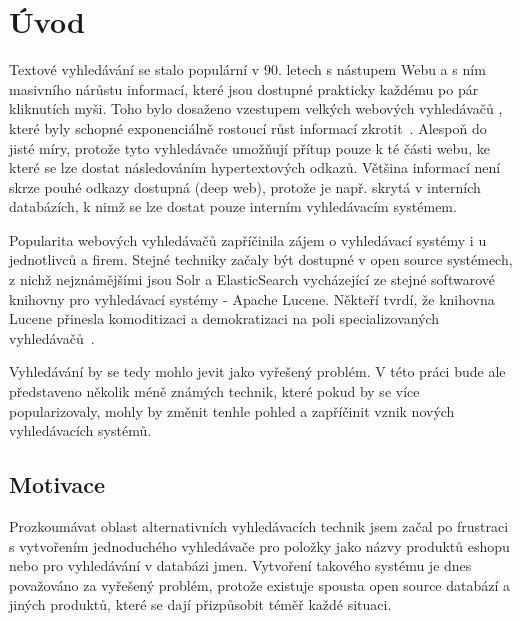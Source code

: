 \documentclass[11pt,letterpaper,oneside,openright]{book}
\begin{document}
\frontmatter
{\hypersetup{hidelinks}
    \tableofcontents
}

\mainmatter
\chapter{Úvod}
Textové vyhledávání se stalo populární v 90. letech s nástupem Webu a s ním
masivního nárůstu informací, které jsou dostupné prakticky každému po pár
kliknutích myši. Toho bylo dosaženo vzestupem velkých webových vyhledávačů ,
které byly schopné exponenciálně rostoucí růst informací
zkrotit~\cite{search_history}. Alespoň do jisté míry, protože tyto vyhledávače
umožňují přítup pouze k té části webu, ke které se lze dostat následováním
hypertextových odkazů. Většina informací není skrze pouhé odkazy dostupná (deep
web), protože je např. skrytá v interních databázích, k nimž se lze dostat
pouze interním vyhledávacím systémem.

Popularita webových vyhledávačů zapříčinila zájem o vyhledávací systémy i u
jednotlivců a firem. Stejné techniky začaly být dostupné v open source
systémech, z nichž nejznámějšími jsou Solr a ElasticSearch vycházející ze
stejné softwarové knihovny pro vyhledávací systémy - Apache Lucene. Někteří
tvrdí, že knihovna Lucene přinesla komoditizaci a demokratizaci na poli
specializovaných vyhledávačů~\cite{dion_almaer,javaworld}.

Vyhledávání by se tedy mohlo jevit jako vyřešený problém. V této práci bude ale
představeno několik méně známých technik, které pokud by se více
popularizovaly, mohly by změnit tenhle pohled a zapříčinit vznik nových
vyhledávacích systémů. 



\section{Motivace}
Prozkoumávat oblast alternativních vyhledávacích technik jsem začal po
frustraci s vytvořením jednoduchého vyhledávače pro položky jako názvy produktů
eshopu nebo pro vyhledávání v databázi jmen. Vytvoření takového systému je dnes
považováno za vyřešený problém, protože existuje spousta open source databází a
jiných produktů, které se dají přizpůsobit téměř každé situaci.
\end{document}
